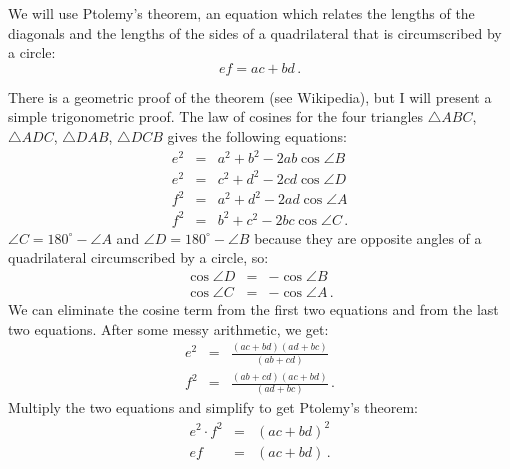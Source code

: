 We will use Ptolemy's theorem, an equation which relates the lengths of the diagonals and the lengths of the sides of a quadrilateral that is circumscribed by a circle:
\[
ef = ac + bd\,.
\]
\begin{center}
\end{center}
There is a geometric proof of the theorem (see Wikipedia), but I will present a simple trigonometric proof. The law of cosines for the four triangles $\triangle ABC$, $\triangle ADC$, $\triangle DAB$, $\triangle DCB$ gives the following equations:
\begin{eqnarray*}
e^2 &=& a^2 + b^2 - 2ab \cos \angle B\\
e^2 &=& c^2 + d^2 - 2cd \cos \angle D\\
f^2 &=& a^2 + d^2 - 2ad \cos \angle A\\
f^2 &=& b^2 + c^2 - 2bc \cos \angle C\,.
\end{eqnarray*}
$\angle C = 180^\circ - \angle A$ and $\angle D = 180^\circ - \angle B$ because they are opposite angles of a quadrilateral circumscribed by a circle, so:
\begin{eqnarray*}
\cos \angle D &=& - \cos \angle B\\
\cos \angle C &=& -\cos \angle A\,.
\end{eqnarray*}
We can eliminate the cosine term from the first two equations and from the last two equations. After some messy arithmetic, we get:
\begin{eqnarray*}
e^2 &=& \frac{(ac+bd)(ad+bc)}{(ab+cd)}\\
f^2 &=& \frac{(ab+cd)(ac+bd)}{(ad+bc)}\,.
\end{eqnarray*}
Multiply the two equations and simplify to get Ptolemy's theorem:
\begin{eqnarray*}
e^2\cdot f^2 &=& (ac+bd)^2\\
ef &=& (ac+bd)\,. 
\end{eqnarray*}
